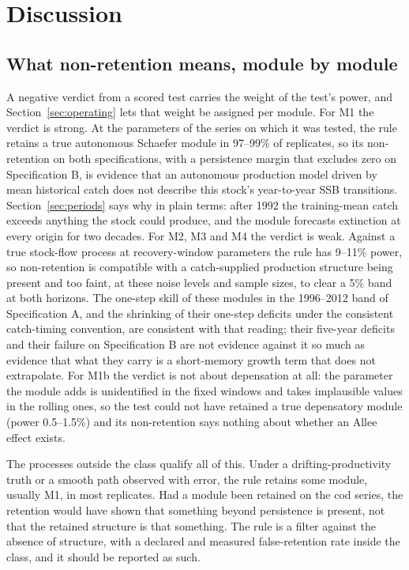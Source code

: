 \section{Discussion}\label{sec:discussion}

\subsection{What non-retention means, module by module}\label{sec:meaning}

A negative verdict from a scored test carries the weight of the test's power, and Section~\ref{sec:operating} lets that weight be assigned per module. For M1 the verdict is strong. At the parameters of the series on which it was tested, the rule retains a true autonomous Schaefer module in 97--99\% of replicates, so its non-retention on both specifications, with a persistence margin that excludes zero on Specification B, is evidence that an autonomous production model driven by mean historical catch does not describe this stock's year-to-year SSB transitions. Section~\ref{sec:periods} says why in plain terms: after 1992 the training-mean catch exceeds anything the stock could produce, and the module forecasts extinction at every origin for two decades. For M2, M3 and M4 the verdict is weak. Against a true stock-flow process at recovery-window parameters the rule has 9--11\% power, so non-retention is compatible with a catch-supplied production structure being present and too faint, at these noise levels and sample sizes, to clear a 5\% band at both horizons. The one-step skill of these modules in the 1996--2012 band of Specification A, and the shrinking of their one-step deficits under the consistent catch-timing convention, are consistent with that reading; their five-year deficits and their failure on Specification B are not evidence against it so much as evidence that what they carry is a short-memory growth term that does not extrapolate. For M1b the verdict is not about depensation at all: the parameter the module adds is unidentified in the fixed windows and takes implausible values in the rolling ones, so the test could not have retained a true depensatory module (power 0.5--1.5\%) and its non-retention says nothing about whether an Allee effect exists.

The processes outside the class qualify all of this. Under a drifting-productivity truth or a smooth path observed with error, the rule retains some module, usually M1, in most replicates. Had a module been retained on the cod series, the retention would have shown that something beyond persistence is present, not that the retained structure is that something. The rule is a filter against the absence of structure, with a declared and measured false-retention rate inside the class, and it should be reported as such.

